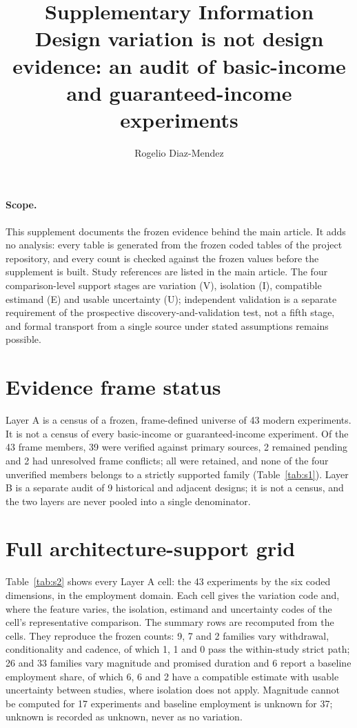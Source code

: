 \documentclass[11pt]{article}
\title{Supplementary Information\\[0.3em] \large Design variation is not design evidence: an audit of basic-income and guaranteed-income experiments}
\author{Rogelio Diaz-Mendez}
\date{}
\begin{document}
\maketitle

\paragraph{Scope.} This supplement documents the frozen evidence behind the main article. It adds no analysis: every table is generated from the frozen coded tables of the project repository, and every count is checked against the frozen values before the supplement is built. Study references are listed in the main article. The four comparison-level support stages are variation (V), isolation (I), compatible estimand (E) and usable uncertainty (U); independent validation is a separate requirement of the prospective discovery-and-validation test, not a fifth stage, and formal transport from a single source under stated assumptions remains possible.

\tableofcontents

\section{Evidence frame status}

Layer A is a census of a frozen, frame-defined universe of 43 modern experiments. It is not a census of every basic-income or guaranteed-income experiment. %
Of the 43 frame members, 39 were verified against primary sources, 2 remained pending and 2 had unresolved frame conflicts; all were retained, and none of the four unverified members belongs to a strictly supported family (Table~\ref{tab:s1}). %
Layer B is a separate audit of 9 historical and adjacent designs; it is not a census, and the two layers are never pooled into a single denominator. %



\section{Full architecture-support grid}

Table~\ref{tab:s2} shows every Layer A cell: the 43 experiments by the six coded dimensions, in the employment domain. %
Each cell gives the variation code and, where the feature varies, the isolation, estimand and uncertainty codes of the cell's representative comparison. The summary rows are recomputed from the cells. They reproduce the frozen counts: 9, 7 and 2 families vary withdrawal, conditionality and cadence, of which 1, 1 and 0 pass the within-study strict path; 26 and 33 families vary magnitude and promised duration and 6 report a baseline employment share, of which 6, 6 and 2 have a compatible estimate with usable uncertainty between studies, where isolation does not apply. %
Magnitude cannot be computed for 17 experiments and baseline employment is unknown for 37; unknown is recorded as unknown, never as no variation. %
\end{document}
